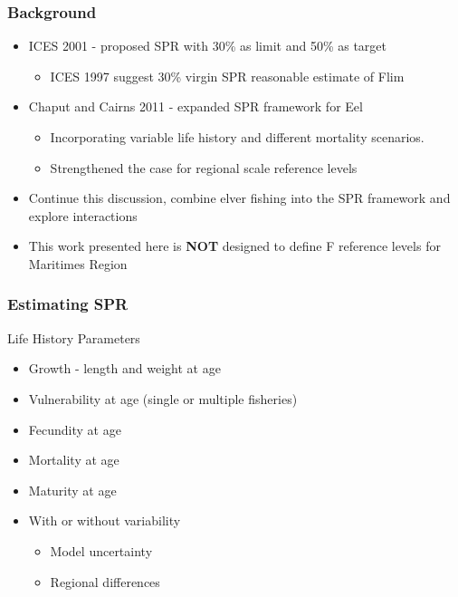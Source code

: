 \documentclass{beamer}
\begin{document}
\begin{frame}
\frametitle{Background}
%
\begin{itemize}
	\item ICES 2001 - proposed SPR with 30\% as limit and 50\% as target
		\begin{itemize}
			\item ICES 1997 suggest 30\% virgin SPR reasonable estimate of Flim
		\end{itemize}
	\item Chaput and Cairns 2011 - expanded SPR framework for Eel
	\begin{itemize}
		\item Incorporating variable life history and different mortality scenarios.
		\item Strengthened the case for regional scale reference levels
	\end{itemize}
\item Continue this discussion, combine elver fishing into the SPR framework and explore interactions
\item This work presented here is \textbf{NOT} designed to define F reference levels for Maritimes Region 
\end{itemize}

\end{frame}
%

\begin{frame}
	\frametitle{Estimating SPR}
	\begin{block}{Life History Parameters}
	\begin{itemize}
		\item Growth - length and weight at age
		\item Vulnerability at age (single or multiple fisheries)
		\item Fecundity at age
		\item Mortality at age 
		\item Maturity at age
		\item With or without variability
			\begin{itemize}
				\item Model uncertainty
				\item Regional differences
			\end{itemize}
	\end{itemize}
	\end{block}

\end{frame}
\end{document}
